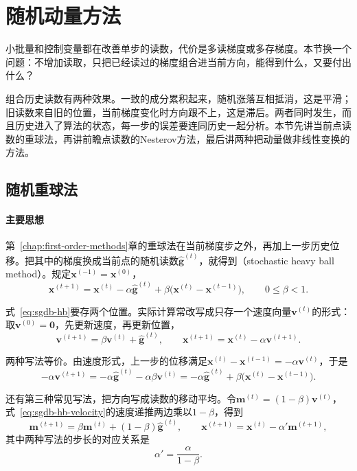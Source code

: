 \section{随机动量方法}
\label{sec:sgdb-momentum}

小批量和控制变量都在改善单步的读数，代价是多读梯度或多存梯度。本节换一个问题：不增加读取，只把已经读过的梯度组合进当前方向，能得到什么，又要付出什么？

组合历史读数有两种效果。一致的成分累积起来，随机涨落互相抵消，这是平滑；旧读数来自旧的位置，当前梯度变化时方向跟不上，这是滞后。两者同时发生，而且历史进入了算法的状态，每一步的误差要连同历史一起分析。本节先讲当前点读数的重球法，再讲前瞻点读数的Nesterov方法，最后讲两种把动量做非线性变换的方法。

\subsection{随机重球法}
\label{sec:sgdb-heavy-ball}

\paragraph{主要思想}
第~\ref{chap:first-order-methods}章的重球法在当前梯度步之外，再加上一步历史位移。把其中的梯度换成当前点的随机读数$\hat{\bm g}^{(t)}$，就得到（stochastic heavy ball method）。规定$\bm{x}^{(-1)}=\bm{x}^{(0)}$，
\begin{equation}
 \bm{x}^{(t+1)}=\bm{x}^{(t)}-\alpha\hat{\bm g}^{(t)}+\beta\bigl(\bm{x}^{(t)}-\bm{x}^{(t-1)}\bigr),\qquad 0\leq\beta<1.
 \label{eq:sgdb-hb}
\end{equation}

式~\eqref{eq:sgdb-hb}要存两个位置。实际计算常改写成只存一个速度向量$\bm{v}^{(t)}$的形式：取$\bm{v}^{(0)}=\bm{0}$，先更新速度，再更新位置，
\begin{equation}
 \bm{v}^{(t+1)}=\beta\bm{v}^{(t)}+\hat{\bm g}^{(t)},\qquad
 \bm{x}^{(t+1)}=\bm{x}^{(t)}-\alpha\bm{v}^{(t+1)}.
 \label{eq:sgdb-hb-velocity}
\end{equation}

两种写法等价。由速度形式，上一步的位移满足$\bm{x}^{(t)}-\bm{x}^{(t-1)}=-\alpha\bm{v}^{(t)}$，于是
\[
 -\alpha\bm{v}^{(t+1)}=-\alpha\hat{\bm g}^{(t)}-\alpha\beta\bm{v}^{(t)}
 =-\alpha\hat{\bm g}^{(t)}+\beta\bigl(\bm{x}^{(t)}-\bm{x}^{(t-1)}\bigr).
\]

还有第三种常见写法，把方向写成读数的移动平均。令$\bm{m}^{(t)}=(1-\beta)\bm{v}^{(t)}$，式~\eqref{eq:sgdb-hb-velocity}的速度递推两边乘以$1-\beta$，得到
\begin{equation}
 \bm{m}^{(t+1)}=\beta\bm{m}^{(t)}+(1-\beta)\hat{\bm g}^{(t)},\qquad
 \bm{x}^{(t+1)}=\bm{x}^{(t)}-\alpha'\bm{m}^{(t+1)},
 \label{eq:sgdb-hb-ema}
\end{equation}
其中两种写法的步长的对应关系是
\begin{equation}
 \alpha'=\frac{\alpha}{1-\beta}.
 \label{eq:sgdb-hb-effective}
\end{equation}


